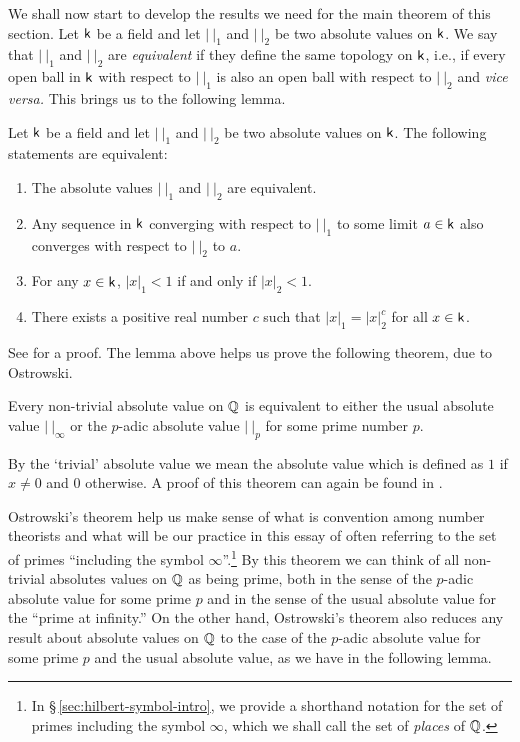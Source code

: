 We shall now start to develop the results we need for the main theorem of this section. Let \(\mathsf{k}\) be a field and let \(|\ |_1\) and \(|\ |_2\) be two absolute values on \(\mathsf{k}\). We say that \(|\ |_1\) and \(|\ |_2\) are \emph{equivalent} if they define the same topology on \(\mathsf{k}\), i.e., if every open ball in \(\mathsf{k}\) with respect to \(|\ |_1\) is also an open ball with respect to \(|\ |_2\) and \emph{vice versa.} This brings us to the following lemma.

\begin{lemma}
    Let \(\mathsf{k}\) be a field and let \(|\ |_1\) and \(|\ |_2\) be two absolute values on \(\mathsf{k}\). The following statements are equivalent:

    \smallskip

    \begin{enumerate}[nosep, label=(\alph*)]
        \item The absolute values \(|\ |_1\) and \(|\ |_2\) are equivalent.
        \item Any sequence in \(\mathsf{k}\) converging with respect to \(|\ |_1\) to some limit \(a \in \mathsf{k}\) also converges with respect to \(|\ |_2\) to \(a\).
        \item For any \(x \in \mathsf{k}\), \(|x|_1 < 1\) if and only if \(|x|_2 < 1\).
        \item There exists a positive real number \(c\) such that \(|x|_1 = |x|_2^c\) for all \(x \in \mathsf{k}\).
    \end{enumerate}
\end{lemma}

See \cite[pp.~54-56]{gouvea1997p} for a proof. The lemma above helps us prove the following theorem, due to Ostrowski.

\begin{theoremx}[Ostrowski]\label{thm:ostrowski}
    Every non-trivial absolute value on \(\mathbb{Q}\) is equivalent to either the usual absolute value \(|\ |_{\infty}\) or the \(p\)-adic absolute value \(|\ |_p\) for some prime number \(p\).
\end{theoremx}

By the `trivial' absolute value we mean the absolute value which is defined as \(1\) if \(x \neq 0\) and \(0\) otherwise. A proof of this theorem can again be found in \cite[pp.~56--59]{gouvea1997p}.

Ostrowski's theorem help us make sense of what is convention among number theorists and what will be our practice in this essay of often referring to the set of primes ``including the symbol \(\infty\)''.\footnote{In \S\,\ref{sec:hilbert-symbol-intro}, we provide a shorthand notation for the set of primes including the symbol \(\infty\), which we shall call the set of \emph{places} of \(\mathbb{Q}\).} By this theorem we can think of all non-trivial absolutes values on \(\mathbb{Q}\) as being prime, both in the sense of the \(p\)-adic absolute value for some prime \(p\) and in the sense of the usual absolute value for the ``prime at infinity.'' On the other hand, Ostrowski's theorem also reduces any result about absolute values on \(\mathbb{Q}\) to the case of the \(p\)-adic absolute value for some prime \(p\)  and the usual absolute value, as we have in the following lemma.

